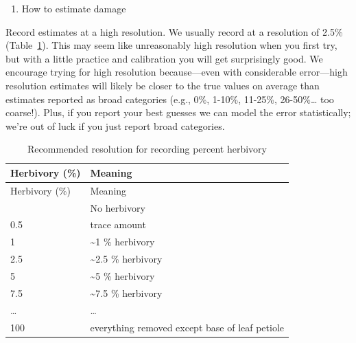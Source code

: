 \documentclass[
  letterpaper,
  oneside,
  open=any]{scrbook}
\providecommand{\tightlist}{%
  \setlength{\itemsep}{0pt}\setlength{\parskip}{0pt}}\usepackage{longtable,booktabs,array}
\begin{document}
\begin{enumerate}
\def\labelenumi{\arabic{enumi}.}
\tightlist
\item
  How to estimate damage
\end{enumerate}

Record estimates at a high resolution. We usually record at a resolution
of 2.5\% (Table~\ref{tbl-herbiv}). This may seem like unreasonably high
resolution when you first try, but with a little practice and
calibration you will get surprisingly good. We encourage trying for high
resolution because---even with considerable error---high resolution
estimates will likely be closer to the true values on average than
estimates reported as broad categories (e.g., 0\%, 1-10\%, 11-25\%,
26-50\%\ldots{} too coarse!). Plus, if you report your best guesses we
can model the error statistically; we're out of luck if you just report
broad categories.

\begin{longtable}[]{@{}ll@{}}
\caption{Recommended resolution for recording percent
herbivory}\label{tbl-herbiv}\tabularnewline
\toprule\noalign{}
Herbivory (\%) & Meaning \\
\midrule\noalign{}
\endfirsthead
\toprule\noalign{}
Herbivory (\%) & Meaning \\
\midrule\noalign{}
\endhead
\bottomrule\noalign{}
\endlastfoot
0 & No herbivory \\
0.5 & trace amount \\
1 & \textasciitilde1 \% herbivory \\
2.5 & \textasciitilde2.5 \% herbivory \\
5 & \textasciitilde5 \% herbivory \\
7.5 & \textasciitilde7.5 \% herbivory \\
\ldots{} & \ldots{} \\
100 & everything removed except base of leaf petiole \\
\end{longtable}
\end{document}
